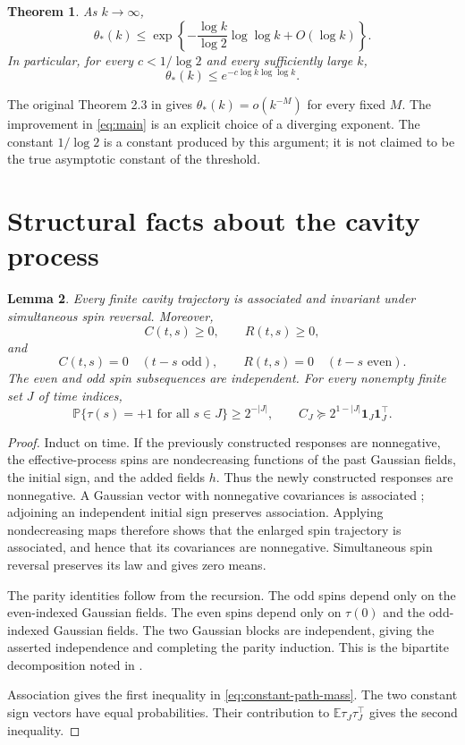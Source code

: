 \documentclass[11pt]{article}
\newtheorem{theorem}{Theorem}[section]
\newtheorem{lemma}[theorem]{Lemma}
\theoremstyle{remark}\newtheorem{remark}[theorem]{Remark}
\newcommand{\E}{\mathbb E}
\newcommand{\Pp}{\mathbb P}
\newcommand{\one}{\mathbf 1}
\begin{document}
\begin{theorem}\label{thm:asymptotic}
As $k\to\infty$,
\begin{equation}\label{eq:main}
 \theta_*(k)\le
 \exp\!\left\{-\frac{\log k}{\log 2}
  \log\log k+O(\log k)\right\}.
\end{equation}
In particular, for every $c<1/\log 2$ and every sufficiently large $k$,
\[
 \theta_*(k)\le e^{-c\log k\log\log k}.
\]
\end{theorem}

The original Theorem 2.3 in \cite{KM} gives $\theta_*(k)=o(k^{-M})$
for every fixed $M$. The improvement in \eqref{eq:main} is an explicit
choice of a diverging exponent. The constant $1/\log 2$ is a constant
produced by this argument; it is not claimed to be the true asymptotic
constant of the threshold.

\section{Structural facts about the cavity process}
\begin{lemma}\label{lem:structure}
Every finite cavity trajectory is associated and invariant under
simultaneous spin reversal. Moreover,
\[
 C(t,s)\ge0,\qquad R(t,s)\ge0,
\]
and
\begin{equation}\label{eq:parity}
 C(t,s)=0\quad(t-s\text{ odd}),\qquad
 R(t,s)=0\quad(t-s\text{ even}).
\end{equation}
The even and odd spin subsequences are independent. For every nonempty
finite set $J$ of time indices,
\begin{equation}\label{eq:constant-path-mass}
 \Pp\{\tau(s)=+1\text{ for all }s\in J\}\ge2^{-|J|},\qquad
 C_J\succeq 2^{1-|J|}\one_J\one_J^\top.
\end{equation}
\end{lemma}
\begin{proof}
Induct on time. If the previously constructed responses are nonnegative,
the effective-process spins are nondecreasing functions of the past
Gaussian fields, the initial sign, and the added fields $h$.
Thus the newly constructed responses are nonnegative. A Gaussian vector
with nonnegative covariances is associated \cite{Pitt}; adjoining an
independent initial sign preserves association. Applying nondecreasing
maps therefore shows that the enlarged spin trajectory is associated,
and hence that its covariances are nonnegative. Simultaneous spin reversal
preserves its law and gives zero means.

The parity identities follow from the recursion. The odd spins depend
only on the even-indexed Gaussian fields. The even spins depend only on
$\tau(0)$ and the odd-indexed Gaussian fields. The two Gaussian blocks are
independent, giving the asserted independence and completing the parity
induction. This is the bipartite decomposition noted in \cite{KM}.

Association gives the first inequality in \eqref{eq:constant-path-mass}.
The two constant sign vectors have equal probabilities. Their contribution
to $\E\tau_J\tau_J^\top$ gives the second inequality.
\end{proof}
\end{document}
